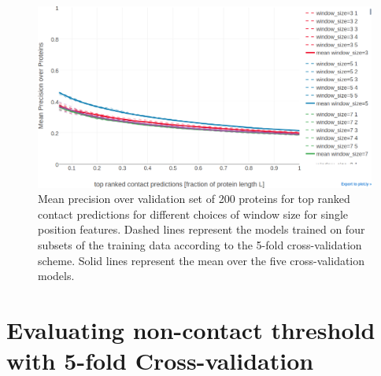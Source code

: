 \documentclass[12pt,a4paper,twoside]{book}
\theoremstyle{definition}
\theoremstyle{definition}
\theoremstyle{remark}
\begin{document}
\begin{figure}

{\centering \includegraphics[width=0.9\linewidth]{img/random_forest_contact_prior/cross_validation/precision_vs_rank_cv_on_test_random_forest_nestimators1000_maxfeatureslog2_maxdepth10_minsamplesleaf100_windowsize} 

}

\caption{Mean precision over
validation set of 200 proteins for top ranked contact predictions for
different choices of window size for single position features. Dashed
lines represent the models trained on four subsets of the training data
according to the 5-fold cross-validation scheme. Solid lines represent
the mean over the five cross-validation models.}\label{fig:random-forest-window-size-cv}
\end{figure}

\section{Evaluating non-contact threshold with 5-fold
Cross-validation}\label{rf-noncontact-threshold}
\end{document}
